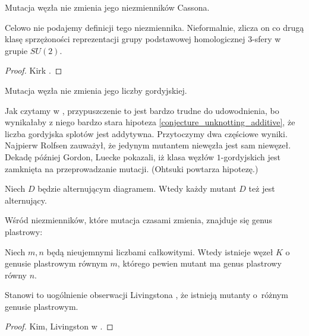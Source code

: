 \begin{proposition}
%
    Mutacja węzła nie zmienia jego niezmienników Cassona.
\end{proposition}

Celowo nie podajemy definicji tego niezmiennika.
Nieformalnie, zlicza on co drugą klasę sprzężoności reprezentacji grupy podstawowej homologicznej 3-sfery w grupie $SU(2)$.

\begin{proof}
%
    Kirk \cite{kirk1989}.
\end{proof}

\begin{conjecture}
    Mutacja węzła nie zmienia jego liczby gordyjskiej.
\end{conjecture}

Jak czytamy w \cite[problem 1.69]{kirby1978}, przypuszczenie to jest bardzo trudne do udowodnienia, bo wynikałaby z niego bardzo stara hipoteza \ref{conjecture_unknotting_additive}, że liczba gordyjska splotów jest addytywna.
%
Przytoczymy dwa częściowe wyniki.
Najpierw Rolfsen \cite{rolfsen1993} zauważył, że jedynym mutantem niewęzła jest sam niewęzeł.
%
Dekadę później Gordon, Luecke \cite{gordon2006} pokazali, iż klasa węzłów $1$-gordyjskich jest zamknięta na przeprowadzanie mutacji.
%
%
(Ohtsuki \cite[problem 12.15]{ohtsuki2002} powtarza hipotezę.)
%

\begin{proposition}
    Niech $D$ będzie alternującym diagramem.
    Wtedy każdy mutant $D$ też jest alternujący.
\end{proposition}

Wśród niezmienników, które mutacja czasami zmienia, znajduje się genus plastrowy:

\begin{proposition}
%
    Niech $m, n$ będą nieujemnymi liczbami całkowitymi.
    Wtedy istnieje węzeł $K$ o genusie plastrowym równym $m$, którego pewien mutant ma genus plastrowy równy $n$.
\end{proposition}

Stanowi to uogólnienie obserwacji Livingstona \cite{livingston1983}, że istnieją mutanty o~różnym genusie plastrowym.
%

\begin{proof}
    Kim, Livingston w \cite{kim2005}.
\end{proof}

